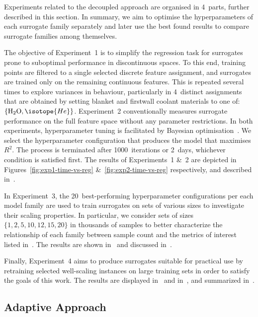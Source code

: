Experiments related to the decoupled approach are organised in 4~parts,
further described in this section. In summary, we aim to optimise the hyperparameters of
each surrogate family separately and later use the best found results to compare surrogate
families among themselves.

The objective of Experiment~1 is to simplify the regression task for
surrogates prone to suboptimal performance in discontinuous spaces.
To this end, training points are filtered to a single selected discrete feature
assignment, and surrogates are trained only on the remaining continuous features.
This is repeated several times to explore variances in behaviour,
particularly in 4~distinct assignments that are obtained by setting blanket and
firstwall coolant materials to one
of:~$\{\text{H\textsubscript{2}O},\isotope{He}\}$.
Experiment~2 conventionally measures surrogate performance on the full feature
space without any parameter restrictions. In both experiments, hyperparameter tuning is
facilitated by Bayesian optimisation~\cite{movckus1975bayesian}. We select the
hyperparameter configuration that produces the model that maximises $R^2$. The
process is terminated after 1000~iterations or 2~days, whichever condition is satisfied first.
The results of Experiments~1 \&~2 are depicted
in Figures~\ref{fig:exp1-time-vs-reg} \&~\ref{fig:exp2-time-vs-reg}
respectively, and described in~.

In Experiment~3, the 20~best-performing hyperparameter configurations
per each model family are used to train surrogates on sets of various sizes to
investigate their scaling properties. In particular, we consider sets of
sizes~$\{1,2,5,10,12,15,20\}$ in thousands of samples to better characterize the
relationship of each family between sample count and the metrics of interest
listed in~.
The results are shown in~ and discussed
in~.

Finally, Experiment~4 aims
to produce surrogates suitable for practical use by retraining selected
well-scaling instances on large training sets in order to satisfy the goals of this work.
The results are displayed in~ and
in~, and summarized in~.


\subsection{Adaptive Approach}\label{sec:adaptive}

